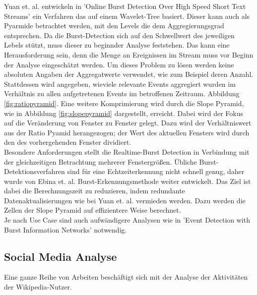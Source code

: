 Yuan et. al. entwickeln in 'Online Burst Detection Over High Speed Short Text Streams' \cite{yuan2007online} ein Verfahren das auf einem Wavelet-Tree basiert. Dieser kann auch als Pyarmide betrachtet werden, mit den Levels die dem Aggregierungsgrad entsprechen. Da die Burst-Detection sich auf den Schwellwert des jeweiligen Lebels stützt, muss dieser zu beginnder Analyse feststehen. Das kann eine Herausforderung sein, denn  die Menge an Ereignissen im Stream muss vor Beginn der Analyse eingeschätzt werden. Um dieses Problem zu lösen werden keine absoluten Angaben der Aggregatwerte verwendet, wie zum Beispiel deren Anzahl. Stattdessen wird angegeben, wieviele relevante Events aggregiert wurden im Verhältnis zu allen aufgetretenen Events im betroffenen Zeitraum. Abbildung \ref{fig:ratiopyramid}. Eine weitere Komprimierung wird durch die Slope Pyramid, wie in Abbildung \ref{fig:slopepyramid} dargestellt, erreicht. Dabei wird der Fokus auf die Veränderung von Fenster zu Fenster gelegt. Dazu wird der Verhältniswert aus der Ratio Pyamid herangezogen; der Wert des aktuellen Fensters wird durch den des vorhergehenden Fenster dividiert.\cite{yuan2007online}\\

Besondere Anforderungen stellt die Realtime-Burst Detection in Verbindung mit der gleichzeitigen Betrachtung mehrerer Fenstergrößen. Übliche Burst-Detektionsverfahren sind für eine Echtzeiterkennung nicht schnell genug, daher wurde von Ebina et. al. \cite{ebina2011real} Burst-Erkennungsmethode weiter entwickelt. Das Ziel ist dabei die Berechnungszeit zu reduzieren, indem redundante Datenaktualisierungen wie bei Yuan et. al. vermieden werden. Dazu werden die Zellen der Slope Pyramid auf effizientere Weise berechnet.\cite{ebina2011real}\\

Je nach Use Case sind auch aufwändigere Analysen wie in 'Event Detection with Burst Information Networks' \cite{ge2016event} notwendig.


\subsection{Social Media Analyse}
Eine ganze Reihe von Arbeiten beschäftigt sich mit der Analyse der Aktivitäten der Wikipedia-Nutzer.

